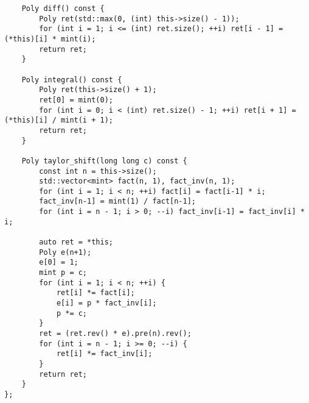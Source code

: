 \begin{lstlisting}
    Poly diff() const {
        Poly ret(std::max(0, (int) this->size() - 1));
        for (int i = 1; i <= (int) ret.size(); ++i) ret[i - 1] = (*this)[i] * mint(i);
        return ret;
    }

    Poly integral() const {
        Poly ret(this->size() + 1);
        ret[0] = mint(0);
        for (int i = 0; i < (int) ret.size() - 1; ++i) ret[i + 1] = (*this)[i] / mint(i + 1);
        return ret;
    }

    Poly taylor_shift(long long c) const {
        const int n = this->size();
        std::vector<mint> fact(n, 1), fact_inv(n, 1);
        for (int i = 1; i < n; ++i) fact[i] = fact[i-1] * i;
        fact_inv[n-1] = mint(1) / fact[n-1];
        for (int i = n - 1; i > 0; --i) fact_inv[i-1] = fact_inv[i] * i;

        auto ret = *this;
        Poly e(n+1);
        e[0] = 1;
        mint p = c;
        for (int i = 1; i < n; ++i) {
            ret[i] *= fact[i];
            e[i] = p * fact_inv[i];
            p *= c;
        }
        ret = (ret.rev() * e).pre(n).rev();
        for (int i = n - 1; i >= 0; --i) {
            ret[i] *= fact_inv[i];
        }
        return ret;
    }
};
\end{lstlisting}